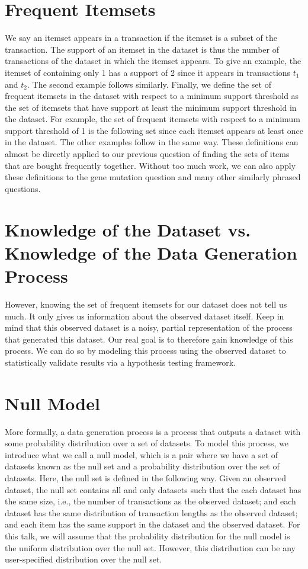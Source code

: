 \documentclass{article}
\begin{document}
\section*{Frequent Itemsets}

We say an itemset appears in a transaction if the itemset is a subset of the
transaction. The support of an itemset in the dataset is thus the number of
transactions of the dataset in which the itemset appears. To give an example,
the itemset of containing only 1 has a support of 2 since it appears in
transactions $t_1$ and $t_2$. The second example follows similarly. Finally, we
define the set of frequent itemsets in the dataset with respect to a minimum
support threshold as the set of itemsets that have support at least the minimum
support threshold in the dataset. For example, the set of frequent itemsets with
respect to a minimum support threshold of 1 is the following set since each
itemset appears at least once in the dataset. The other examples follow in the
same way. These definitions can almost be directly applied to our previous
question of finding the sets of items that are bought frequently together.
Without too much work, we can also apply these definitions to the gene mutation
question and many other similarly phrased questions.

\section*{Knowledge of the Dataset vs. Knowledge of the Data Generation Process}

However, knowing the set of frequent itemsets for our dataset does not tell us
much. It only gives us information about the observed dataset itself. Keep in
mind that this observed dataset is a noisy, partial representation of the
process that generated this dataset. Our real goal is to therefore gain
knowledge of this process. We can do so by modeling this process using the
observed dataset to statistically validate results via a hypothesis testing
framework.

\section*{Null Model}

More formally, a data generation process is a process that outputs a dataset
with some probability distribution over a set of datasets. To model this
process, we introduce what we call a null model, which is a pair where we have a
set of datasets known as the null set and a probability distribution over the
set of datasets. Here, the null set is defined in the following way. Given an
observed dataset, the null set contains all and only datasets such that the each
dataset has the same size, i.e., the number of transactions as the observed
dataset; and each dataset has the same distribution of transaction lengths as
the observed dataset; and each item has the same support in the dataset and the
observed dataset. For this talk, we will assume that the probability
distribution for the null model is the uniform distribution over the null set.
However, this distribution can be any user-specified distribution over the null
set.
\end{document}

